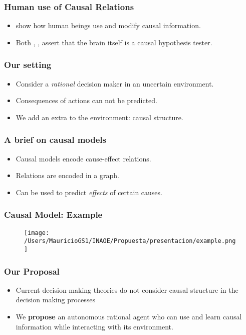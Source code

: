 \documentclass{beamer}
\theoremstyle{plain}
\begin{document}
\begin{frame}
\frametitle{Human use of Causal Relations}
\begin{itemize}
\item \cite{hagmayer2013repeated} show how human beings use and modify causal information.
\item Both \cite{hohwy2013predictive}, \cite{clark2015surfing}, assert that the brain itself is a causal hypothesis tester. 
\end{itemize}
\end{frame}

\begin{frame}
\frametitle{Our setting}
\begin{itemize}
\item Consider a \textit{rational} decision maker in an uncertain environment.
\item Consequences of actions can not be predicted.
\item We add an extra to the environment: causal structure. 
\end{itemize}
\end{frame}

\begin{frame}
\frametitle{A brief on causal models}
\begin{itemize}
\item Causal models encode cause-effect relations. 
\item Relations are encoded in a graph.
\item Can be used to predict \textit{effects} of certain causes.
\end{itemize}
\end{frame}

\begin{frame}
\frametitle{Causal Model: Example}
\begin{figure}[ht]
\vskip 0.2in
\begin{center}
\texttt{[image: /Users/MauricioGS1/INAOE/Propuesta/presentacion/example.png]}
\end{center}
\vskip -0.2in
\end{figure}
\end{frame}

\begin{frame}
\frametitle{Our Proposal}
\begin{itemize}
\item Current decision-making theories do not consider causal structure in the decision making processes
\item We \textbf{propose} an autonomous rational agent who can use and learn causal information while interacting with its environment.
\end{itemize}
\end{frame}
\end{document}
